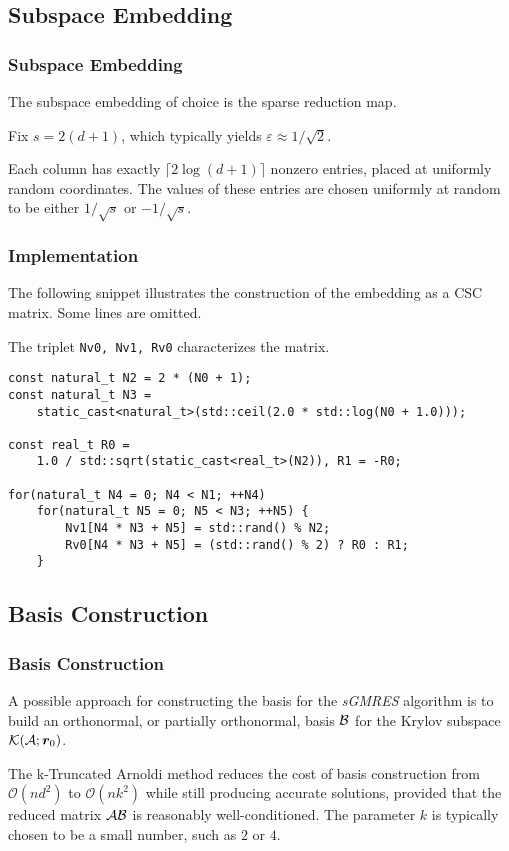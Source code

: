 \subsection{Subspace Embedding}

\begin{frame}
    \frametitle{Subspace Embedding}

    The subspace embedding of choice is the sparse reduction map. 
    
    Fix $s = 2 \left( d + 1 \right)$, which typically yields $\varepsilon \approx 1 / \sqrt{2}$.
    
    Each column has exactly $\lceil 2 \log \left( d + 1 \right) \rceil$ nonzero entries, placed at uniformly random coordinates. The values of these entries are chosen uniformly at random to be either $1 / \sqrt{s}$ or $-1 / \sqrt{s}$.
\end{frame}

\begin{frame}[fragile]
    \frametitle{Implementation}

    The following snippet illustrates the construction of the embedding as a CSC matrix. Some lines are omitted.

    The triplet \lstinline{Nv0, Nv1, Rv0} characterizes the matrix.

\begin{lstlisting}[style=cpp]
const natural_t N2 = 2 * (N0 + 1);
const natural_t N3 = 
    static_cast<natural_t>(std::ceil(2.0 * std::log(N0 + 1.0)));

const real_t R0 =
    1.0 / std::sqrt(static_cast<real_t>(N2)), R1 = -R0;

for(natural_t N4 = 0; N4 < N1; ++N4)
    for(natural_t N5 = 0; N5 < N3; ++N5) {
        Nv1[N4 * N3 + N5] = std::rand() % N2;
        Rv0[N4 * N3 + N5] = (std::rand() % 2) ? R0 : R1;
    }
\end{lstlisting}

\end{frame}

\subsection{Basis Construction}

\begin{frame}
    \frametitle{Basis Construction}

    A possible approach for constructing the basis for the \textit{sGMRES} algorithm is to build an orthonormal, or partially orthonormal, basis $\mathcal{B}$ for the Krylov subspace $\mathcal{K}(\mathcal{A}; \bm{r}_0)$.

    The k-Truncated Arnoldi method reduces the cost of basis construction from $\mathcal{O}(n d^2)$ to $\mathcal{O}(n k^2)$ while still producing accurate solutions, provided that the reduced matrix $\mathcal{A} \mathcal{B}$ is reasonably well-conditioned. The parameter $k$ is typically chosen to be a small number, such as $2$ or $4$.
\end{frame}

